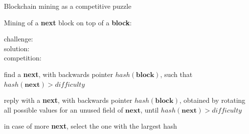 \documentclass[11pt]{beamer}  %
\newcommand{\hash}{{\mathit{hash}}}
\newcommand{\difficulty}{{\mathit{difficulty}}}
\begin{document}
\begin{frame}{Blockchain mining as a competitive puzzle}

  Mining of a \textbf{next} block on top of a \textbf{block}:

  \begin{description}
  \item[{\color{red}challenge:}] 
  \item[{\color{red}solution:}] 
  \item[{\color{red}competition:}] 
  \end{description}

  \bigskip
  \begin{description}
  \item<6->[{\color{red}challenge:}] find a \textbf{next}, with backwards pointer $\hash(\mathbf{block})$,
    such that $\hash(\mathbf{next})>\difficulty$
  \item<7->[{\color{red}solution:}] reply with a \textbf{next}, with backwards pointer $\hash(\mathbf{block})$, obtained
    by rotating all possible values for an unused field of $\mathbf{next}$, until $\hash(\mathbf{next})>\difficulty$
  \item<8->[{\color{red}competition:}] in case of more \textbf{next}, select the one with the largest hash
  \end{description}

\end{frame}
\end{document}
